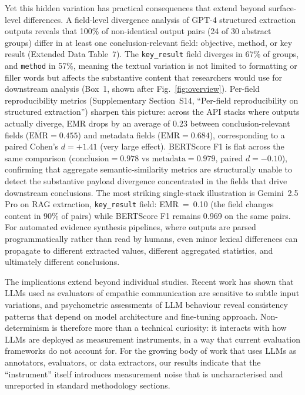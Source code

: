 \documentclass[sn-nature]{sn-jnl}
\begin{document}
Yet this hidden variation has practical consequences that extend beyond surface-level differences.
A field-level divergence analysis of GPT-4 structured extraction outputs reveals that 100\% of non-identical output pairs (24 of 30 abstract groups) differ in at least one conclusion-relevant field: objective, method, or key result (Extended Data Table~7).
The \texttt{key\_result} field diverges in 67\% of groups, and \texttt{method} in 57\%, meaning the textual variation is not limited to formatting or filler words but affects the substantive content that researchers would use for downstream analysis (Box~1, shown after Fig.~\ref{fig:overview}).
Per-field reproducibility metrics (Supplementary Section~S14, ``Per-field reproducibility on structured extraction'') sharpen this picture: across the API stacks where outputs actually diverge, EMR drops by an average of 0.23 between conclusion-relevant fields ($\overline{\text{EMR}}=0.455$) and metadata fields ($\overline{\text{EMR}}=0.684$), corresponding to a paired Cohen's $d=+1.41$ (very large effect). BERTScore F1 is flat across the same comparison ($\overline{\text{conclusion}}=0.978$ vs $\overline{\text{metadata}}=0.979$, paired $d=-0.10$), confirming that aggregate semantic-similarity metrics are structurally unable to detect the substantive payload divergence concentrated in the fields that drive downstream conclusions. The most striking single-stack illustration is Gemini~2.5 Pro on RAG extraction, \texttt{key\_result} field: EMR~=~0.10 (the field changes content in 90\% of pairs) while BERTScore F1 remains 0.969 on the same pairs.
For automated evidence synthesis pipelines, where outputs are parsed programmatically rather than read by humans, even minor lexical differences can propagate to different extracted values, different aggregated statistics, and ultimately different conclusions.

The implications extend beyond individual studies.
Recent work has shown that LLMs used as evaluators of empathic communication are sensitive to subtle input variations\cite{kumar2026reliable}, and psychometric assessments of LLM behaviour reveal consistency patterns that depend on model architecture and fine-tuning approach\cite{serapiogarcía2025psychometric}.
Non-determinism is therefore more than a technical curiosity: it interacts with how LLMs are deployed as measurement instruments, in a way that current evaluation frameworks do not account for.
For the growing body of work that uses LLMs as annotators, evaluators, or data extractors, our results indicate that the ``instrument'' itself introduces measurement noise that is uncharacterised and unreported in standard methodology sections.
\end{document}
